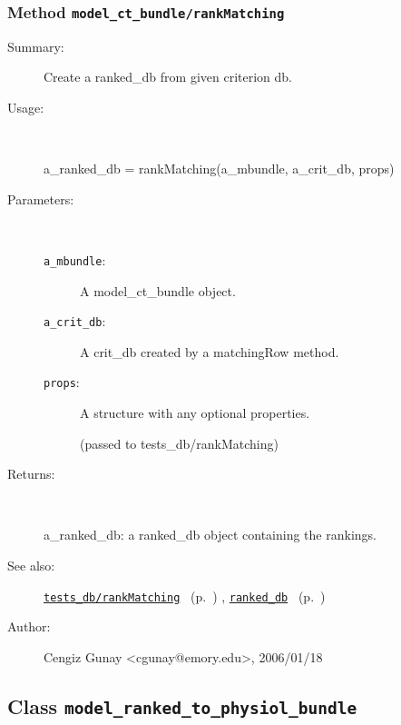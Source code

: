 \subsubsection[Method \texttt{rankMatching}]{Method \texttt{model\_ct\_bundle/rankMatching}}%
%
\label{ref_model_ct_bundle__rankMatching}%
\hypertarget{ref_model_ct_bundle__rankMatching}{}%
\begin{description}
\item[Summary:]Create a ranked\_db from given criterion db.
%
\item[Usage:]~%
\begin{lyxcode}%
a\_ranked\_db = rankMatching(a\_mbundle, a\_crit\_db, props)
%
\end{lyxcode}%
%
%
\item[Parameters:]~
\begin{description}%
\item[\texttt{a\_mbundle}:]
 A model\_ct\_bundle object.
\item[\texttt{a\_crit\_db}:]
 A crit\_db created by a matchingRow method.
\item[\texttt{props}:]
 A structure with any optional properties.

(passed to tests\_db/rankMatching)\end{description}%
%
\item[Returns:]~

	a\_ranked\_db: a ranked\_db object containing the rankings.
%
%
\item[See also:]%
\hyperlink{ref_tests_db__rankMatching}{\texttt{tests\_db/rankMatching}}%
\ (p.~\pageref{ref_tests_db__rankMatching})%
%
, \hyperlink{ref_ranked_db}{\texttt{ranked\_db}}%
\ (p.~\pageref{ref_ranked_db})%
%
%
\item[Author:]%
Cengiz Gunay <cgunay@emory.edu>, 2006/01/18%
\end{description}
\methodline%
\subsection{Class \texttt{model\_ranked\_to\_physiol\_bundle}}%
%
\label{ref_model_ranked_to_physiol_bundle}%
\hypertarget{ref_model_ranked_to_physiol_bundle}{}%
